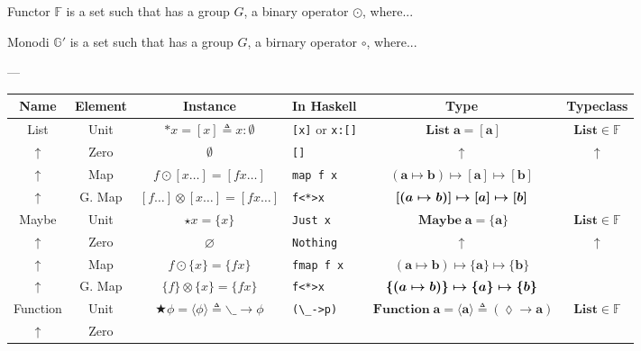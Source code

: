 \documentclass{jsarticle}
\newcommand{\boldsym}[1]{{\boldsymbol{#1}}}
\newcommand{\htypename}[1]{\mathbf{#1}}
\newcommand{\htypeclassname}[1]{\mathbb{#1}}
\begin{document}
Functor $\htypeclassname{F}$ is a set such that has a group $G$, a binary operator $\odot$, where...

Monodi $\htypeclassname{G}'$ is a set such that has a group $G$, a birnary operator $\circ$, where...

---


\begin{center}
\begin{tabular}{||c|c||c|l|c|c||}\hline
Name&Element&Instance&In Haskell&Type&Typeclass\\\hline
\hline
List
    &Unit
    &$\ast x=[x]\triangleq x:\emptyset$
    &\texttt{[x]} or \texttt{x:[]}
    &$\mathop{\textbf{List}}\htypename{a}=\boldsym{[a]}$
    &$\textbf{List}\in\htypeclassname{F}$\\
    \hline
$\uparrow$
    &Zero
    &$\emptyset$
    &\texttt{[]}
    &$\uparrow$
    &$\uparrow$\\
    \hline
$\uparrow$
    &Map
    &$f\odot[x\dots]=[fx\dots]$
    &\texttt{map f x}
    &$(\htypename{a}\mapsto\htypename{b})\mapsto\boldsym{[a]}\mapsto\boldsym{[b]}$
    &\\
    \hline
$\uparrow$
    &G. Map
    &$[f\dots]\otimes[x\dots]=[fx\dots]$
    &\texttt{f<*>x}
    &$\boldsym{[}(\boldmath{a}\mapsto\boldmath{b})\boldsym{]}\mapsto\boldsym{[a]}\mapsto\boldsym{[b]}$
    &\\
    \hline
    \hline
Maybe
    &Unit
    &$\star x=\{x\}$
    &\texttt{Just x}
    &$\mathop{\textbf{Maybe}}\htypename{a}=\boldsym{\{a\}}$
    &$\textbf{List}\in\htypeclassname{F}$\\
    \hline
$\uparrow$
    &Zero
    &$\varnothing$
    &\texttt{Nothing}
    &$\uparrow$
    &$\uparrow$\\
    \hline
$\uparrow$
    &Map
    &$f\odot\{x\}=\{fx\}$
    &\texttt{fmap f x}
    &$(\htypename{a}\mapsto\htypename{b})\mapsto\boldsym{\{a\}}\mapsto\boldsym{\{b\}}$
    &\\
    \hline
$\uparrow$
    &G. Map
    &$\{f\}\otimes\{x\}=\{fx\}$
    &\texttt{f<*>x}
    &$\boldsym{\{}(\boldmath{a}\mapsto\boldmath{b})\boldsym{\}}\mapsto\boldsym{\{a\}}\mapsto\boldsym{\{b\}}$
    &\\
    \hline
    \hline
Function
    &Unit
    &$\bigstar\phi=\langle\phi\rangle\triangleq \backslash\_\longrightarrow\phi$
    &\verb|(\_->p)|
    &$\mathop{\textbf{Function}}\htypename{a}=\boldsym{\langle a\rangle}\triangleq(\lozenge\rightarrow\htypename{a})$
    &$\textbf{List}\in\htypeclassname{F}$\\
    \hline
$\uparrow$
    &Zero

\end{tabular}
\end{center}
\end{document}
